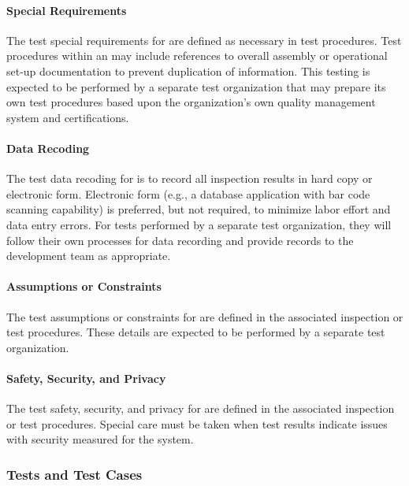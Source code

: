 \paragraph{Special Requirements}
\label{loc:TestSpecialRequirements\TestIdName}

The test special requirements for \TestIdNameX are defined as necessary in test procedures.
Test procedures within an \STS may include references to overall assembly or operational set-up documentation to prevent duplication of information.
This testing is expected to be performed by a separate test organization that may prepare its own test procedures based upon the organization's own quality management system and certifications.

\paragraph{Data Recoding}
\label{loc:TestDataRecoding\TestIdName}

The test data recoding for \TestIdNameX is to record all inspection results in hard copy or electronic form.
Electronic form (e.g., a database application with bar code scanning capability) is preferred, but not required, to minimize labor effort and data entry errors.
For tests performed by a separate test organization, they will follow their own processes for data recording and provide records to the development team as appropriate.

\paragraph{Assumptions or Constraints}
\label{loc:TestAssumptionsOrConstraints\TestIdName}

The test assumptions or constraints for \TestIdNameX are defined in the associated inspection or test procedures.
These details are expected to be performed by a separate test organization.

\paragraph{Safety, Security, and Privacy}
\label{loc:TestSafetySecurityPrivacy\TestIdName}

The test safety, security, and privacy for \TestIdNameX are defined in the associated inspection or test procedures.
Special care must be taken when test results indicate issues with security measured for the system.


\subsubsection{Tests and Test Cases}
\label{loc:TestsAndTestCases\TestIdName}

